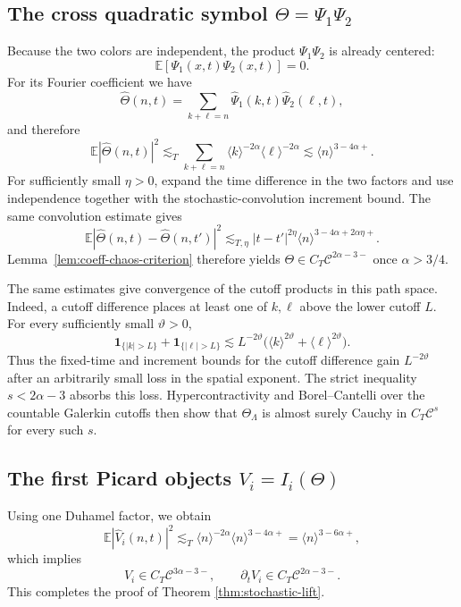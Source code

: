 \documentclass[10pt]{amsart}
\numberwithin{equation}{section}
\theoremstyle{plain}
\theoremstyle{definition}
\theoremstyle{remark}
\newcommand{\E}{\mathbb{E}}
\newcommand{\C}{\mathcal{C}}
\begin{document}
\subsection{The cross quadratic symbol \texorpdfstring{$\Theta=\Psi_1\Psi_2$}{Theta = Psi1 Psi2}}
Because the two colors are independent, the product $\Psi_1\Psi_2$ is already centered:
\begin{equation}\label{eq:cross-centered}
\E[\Psi_1(x,t)\Psi_2(x,t)]=0.
\end{equation}
For its Fourier coefficient we have
\begin{equation}\label{eq:Theta-fourier}
\widehat\Theta(n,t)=\sum_{k+\ell=n}\widehat\Psi_1(k,t)\widehat\Psi_2(\ell,t),
\end{equation}
and therefore
\begin{equation}\label{eq:Theta-var}
\E|\widehat\Theta(n,t)|^2
\lesssim_T \sum_{k+\ell=n}\langle k\rangle^{-2\alpha}\langle \ell\rangle^{-2\alpha}
\lesssim \langle n\rangle^{3-4\alpha+}.
\end{equation}
For sufficiently small $\eta>0$, expand the time difference in the two factors and use independence together with the stochastic-convolution increment bound.  The same convolution estimate gives
\begin{equation}\label{eq:Theta-increment}
 \E|\widehat\Theta(n,t)-\widehat\Theta(n,t')|^2
 \lesssim_{T,\eta}
 |t-t'|^{2\eta}\langle n\rangle^{3-4\alpha+2\alpha\eta+}.
\end{equation}
Lemma~\ref{lem:coeff-chaos-criterion} therefore yields
$\Theta\in C_T\C^{2\alpha-3-}$ once $\alpha>3/4$.

The same estimates give convergence of the cutoff products in this path space.  Indeed, a cutoff difference places at least one of $k,\ell$ above the lower cutoff $L$.  For every sufficiently small $\vartheta>0$,
\[
 \mathbf 1_{\{|k|>L\}}+\mathbf 1_{\{|\ell|>L\}}
 \lesssim L^{-2\vartheta}
 \bigl(\langle k\rangle^{2\vartheta}+\langle\ell\rangle^{2\vartheta}\bigr).
\]
Thus the fixed-time and increment bounds for the cutoff difference gain $L^{-2\vartheta}$ after an arbitrarily small loss in the spatial exponent.  The strict inequality $s<2\alpha-3$ absorbs this loss.  Hypercontractivity and Borel--Cantelli over the countable Galerkin cutoffs then show that $\Theta_\Lambda$ is almost surely Cauchy in $C_T\C^s$ for every such $s$.

\subsection{The first Picard objects \texorpdfstring{$V_i=I_i(\Theta)$}{Vi = Ii(Theta)}}
Using one Duhamel factor, we obtain
\begin{equation}\label{eq:Vi-var}
\E|\widehat V_i(n,t)|^2
\lesssim_T \langle n\rangle^{-2\alpha}\langle n\rangle^{3-4\alpha+}
=\langle n\rangle^{3-6\alpha+},
\end{equation}
which implies
\begin{equation}\label{eq:Vi-reg}
V_i\in C_T\C^{3\alpha-3-},
\qquad
\partial_tV_i\in C_T\C^{2\alpha-3-}.
\end{equation}
This completes the proof of Theorem \ref{thm:stochastic-lift}.
\end{document}
